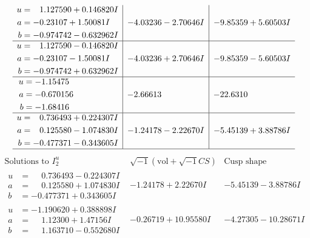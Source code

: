 \documentclass[1p]{elsarticle_modified}
\theoremstyle{definition}
\newcommand{\I}{\sqrt{-1}}
\begin{document}
$$\begin{array}{c|c|c}
\begin{aligned}
u &= \phantom{-}1.127590 + 0.146820 I \\
a &= -0.23107 + 1.50081 I \\
b &= -0.974742 - 0.632962 I\end{aligned}
 & -4.03236 - 2.70646 I & -9.85359 + 5.60503 I \\ \hline\begin{aligned}
u &= \phantom{-}1.127590 - 0.146820 I \\
a &= -0.23107 - 1.50081 I \\
b &= -0.974742 + 0.632962 I\end{aligned}
 & -4.03236 + 2.70646 I & -9.85359 - 5.60503 I \\ \hline\begin{aligned}
u &= -1.15475\phantom{ +0.000000I} \\
a &= -0.670156\phantom{ +0.000000I} \\
b &= -1.68416\phantom{ +0.000000I}\end{aligned}
 & -2.66613\phantom{ +0.000000I} & -22.6310\phantom{ +0.000000I} \\ \hline\begin{aligned}
u &= \phantom{-}0.736493 + 0.224307 I \\
a &= \phantom{-}0.125580 - 1.074830 I \\
b &= -0.477371 - 0.343605 I\end{aligned}
 & -1.24178 - 2.22670 I & -5.45139 + 3.88786 I\\
 \hline 
 \end{array}$$\newpage$$\begin{array}{c|c|c}  
\text{Solutions to }I^u_{2}& \I (\text{vol} + \sqrt{-1}CS) & \text{Cusp shape}\\
 \hline 
\begin{aligned}
u &= \phantom{-}0.736493 - 0.224307 I \\
a &= \phantom{-}0.125580 + 1.074830 I \\
b &= -0.477371 + 0.343605 I\end{aligned}
 & -1.24178 + 2.22670 I & -5.45139 - 3.88786 I \\ \hline\begin{aligned}
u &= -1.190620 + 0.388898 I \\
a &= \phantom{-}1.12300 + 1.47156 I \\
b &= \phantom{-}1.163710 - 0.552680 I\end{aligned}
 & -0.26719 + 10.95580 I & -4.27305 - 10.28671 I \\ \hline\begin{aligned}

\end{aligned}
\end{array}$$
\end{document}
